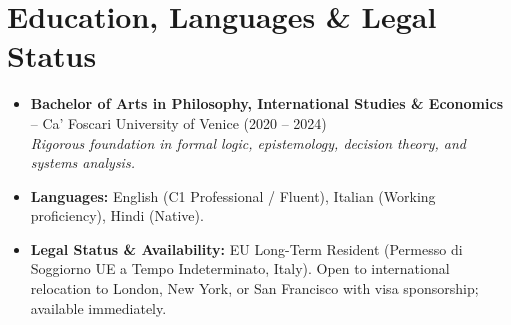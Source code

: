 \documentclass[a4paper,10pt]{article}
\begin{document}
\section{Education, Languages \& Legal Status}
\begin{itemize}
  \item \textbf{Bachelor of Arts in Philosophy, International Studies \& Economics} -- Ca' Foscari University of Venice (2020 -- 2024) \\
  \textit{Rigorous foundation in formal logic, epistemology, decision theory, and systems analysis.}
  \item \textbf{Languages:} English (C1 Professional / Fluent), Italian (Working proficiency), Hindi (Native).
  \item \textbf{Legal Status \& Availability:} EU Long-Term Resident (Permesso di Soggiorno UE a Tempo Indeterminato, Italy). Open to international relocation to London, New York, or San Francisco with visa sponsorship; available immediately.
\end{itemize}
\end{document}
